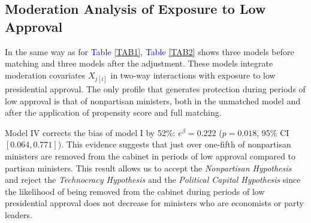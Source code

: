 \documentclass[12pt,halfline,a4paper]{ouparticle}
\begin{document}
\subsection{Moderation Analysis of Exposure to Low Approval}
\label{sec4.2}

In the same way as for \textcolor{blue}{Table} \ref{TAB1}, \textcolor{blue}{Table} \ref{TAB2} shows three models before matching and three models after the adjustment. These models integrate moderation covariates $X_{j[i]}$ in two-way interactions with exposure to low presidential approval. The only profile that generates protection during periods of low approval is that of nonpartisan ministers, both in the unmatched model and after the application of propensity score and full matching. 

Model IV corrects the bias of model I by 52\%: $e^{\beta} = 0.222$ ($p = 0.018$, 95\% CI $[0.064, 0.771]$). This evidence suggests that just over one-fifth of nonpartisan ministers are removed from the cabinet in periods of low approval compared to partisan ministers. This result allows us to accept the {\itshape Nonpartisan Hypothesis} and reject the {\itshape Technocracy Hypothesis} and the {\itshape Political Capital Hypothesis} since the likelihood of being removed from the cabinet during periods of low presidential approval does not decrease for ministers who are economists or party leaders.
\end{document}
